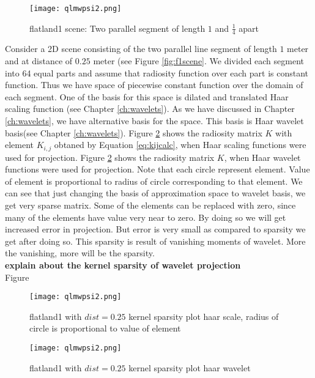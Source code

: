 \begin{figure}[tbh]
\centering{}
\captionsetup{justification=centering}
\texttt{[image: qlmwpsi2.png]}
\caption{\label{fig:f2scene}flatland1 scene: Two parallel segment of length $1$ and $\frac{1}{4}$ apart }
\end{figure}
Consider a 2D scene consisting of the two parallel line segment of length $1$ meter and at distance of $0.25$ meter (see Figure \ref{fig:f1scene}. We divided each segment into 64 equal parts and assume that radiosity function over each part is constant function. Thus we have space of piecewise constant function over the domain of each segment. One of the basis for this space is dilated and translated Haar scaling function (see Chapter \ref{ch:wavelets}). As we have discussed in Chapter \ref{ch:wavelets}, we have alternative basis for the space. This basis is Haar wavelet basis(see Chapter \ref{ch:wavelets}). Figure \ref{fig:haarscalesparsef1} shows the radiosity matrix $K$ with element $K_{i,j}$ obtaned by Equation \ref{eq:kijcalc}, when Haar scaling functions were used for projection. Figure \ref{fig:haarscalesparsef1} shows the radiosity matrix $K$, when Haar wavelet functions were used for projection. Note that each circle represent element. Value of element is proportional to radius of circle corresponding to that element. We can see that just changing the basis of approximation space to wavelet basis, we get very sparse matrix. Some of the elements can be replaced with zero, since many of the elements have value very near to zero. By doing so we will get increased error in projection. But error is very small as compared to sparsity we get after doing so. This sparsity is result of vanishing moments of wavelet. More the vanishing, more will be the sparsity.\\




{\bf explain about the kernel sparsity of wavelet projection }\\
Figure 

\begin{figure}[tbh]
\centering{}
\captionsetup{justification=centering}
\texttt{[image: qlmwpsi2.png]}
\caption{\label{fig:haarscalesparsef1}flatland1 with $dist=0.25$ kernel sparsity plot haar scale, radius of circle is proportional to value of element}
\end{figure}
\begin{figure}[tbh]
\centering{}
\captionsetup{justification=centering}
\texttt{[image: qlmwpsi2.png]}
\caption{\label{fig:haarwaveletsparsef1}flatland1 with $dist=0.25$ kernel sparsity plot haar wavelet}
\end{figure}

